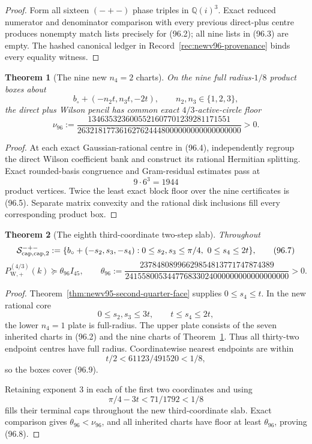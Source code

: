 \documentclass[11pt,oneside]{article}
\newtheorem{theorem}{Theorem}[section]
\theoremstyle{definition}
\theoremstyle{remark}
\begin{document}
\begin{proof}
Form all sixteen \((-+-)\) phase triples in
\(\mathbb Q(i)^3\).  Exact reduced numerator and denominator
comparison with every previous direct-plus centre produces
nonempty match lists precisely for (96.2); all nine lists in
(96.3) are empty.  The hashed canonical ledger in
Record~\ref{rec:newv96-provenance} binds every equality witness.
\end{proof}

\begin{theorem}[The nine new \(n_4=2\) charts]
\label{thm:newv96-nine-charts}
On the nine full radius-\(1/8\) product boxes about
\[
 b_\circ+(-n_2t,n_3t,-2t),\qquad
 n_2,n_3\in\{1,2,3\},                               \tag{96.4}
\]
the direct plus Wilson pencil has common exact
\(4/3\)-active-circle floor
\[
\nu_{96}:=
\frac{1346353236005521607701239281171551}
     {263218177361627624448000000000000000000}>0.    \tag{96.5}
\]
\end{theorem}

\begin{proof}
At each exact Gaussian-rational centre in (96.4), independently
regroup the direct Wilson coefficient bank and construct its
rational Hermitian splitting.  Exact rounded-basis congruence and
Gram-residual estimates pass at
\[
 9\cdot6^3=1944                                     \tag{96.6}
\]
product vertices.  Twice the least exact block floor over the nine
certificates is (96.5).  Separate matrix convexity and the rational
disk inclusions fill every corresponding product box.
\end{proof}

\begin{theorem}[The eighth third-coordinate two-step slab]
\label{thm:newv96-two-step-slab}
Throughout
\[
 {\cal S}^{-+-}_{\mathrm{cap},\mathrm{cap},2}:=
 \{b_\circ+(-s_2,s_3,-s_4):
 0\leq s_2,s_3\leq\pi/4,\ 0\leq s_4\leq2t\},        \tag{96.7}
\]
\[
 P_{\mathrm W,+}^{(4/3)}(k)
 \succeq\theta_{96}I_{45},\qquad
 \theta_{96}:=
 \frac{23784808996629854813771747874389}
 {241558005344776833024000000000000000000}>0.         \tag{96.8}
\]
\end{theorem}

\begin{proof}
Theorem~\ref{thm:newv95-second-quarter-face} supplies
\(0\leq s_4\leq t\).  In the new rational core
\[
 0\leq s_2,s_3\leq3t,\qquad t\leq s_4\leq2t,        \tag{96.9}
\]
the lower \(n_4=1\) plate is full-radius.  The upper plate consists
of the seven inherited charts in (96.2) and the nine charts of
Theorem~\ref{thm:newv96-nine-charts}.  Thus all thirty-two endpoint
centres have full radius.  Coordinatewise nearest endpoints are
within
\[
 t/2<61123/491520<1/8,                              \tag{96.10}
\]
so the boxes cover (96.9).

Retaining exponent \(3\) in each of the first two coordinates and
using
\[
 \pi/4-3t<71/1792<1/8                               \tag{96.11}
\]
fills their terminal caps throughout the new third-coordinate
slab.  Exact comparison gives \(\theta_{96}<\nu_{96}\), and all
inherited charts have floor at least \(\theta_{96}\), proving
(96.8).
\end{proof}
\end{document}
